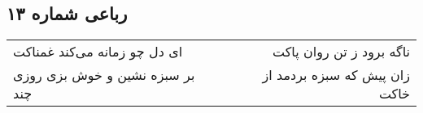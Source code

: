\begin{center}
\section*{رباعی شماره ۱۳}
\label{sec:sh013}
\begin{longtable}{l p{0.5cm} r}
ای دل چو زمانه می‌کند غمناکت
&&
ناگه برود ز تن روان پاکت
\\
بر سبزه نشین و خوش بزی روزی چند
&&
زان پیش که سبزه بردمد از خاکت
\\
\end{longtable}
\end{center}
